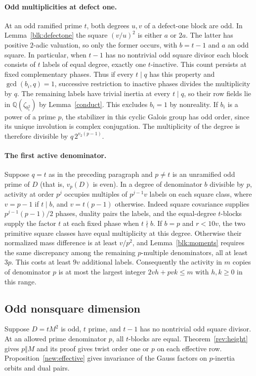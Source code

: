\documentclass[11pt]{amsart}
\numberwithin{equation}{section}
\theoremstyle{definition}
\theoremstyle{plain}
\newcommand{\QQ}{\mathbb Q}
\begin{document}
\paragraph{Odd multiplicities at defect one.}
At an odd ramified prime $t$, both degrees $u,v$ of a defect-one
block are odd. In Lemma~\ref{blk:defectone} the square $(v/u)^2$
is either $a$ or $2a$. The latter has positive $2$-adic valuation,
so only the former occurs, with $b=t-1$ and $a$ an odd square.
In particular, when $t-1$ has no nontrivial odd square divisor
each block consists of $t$ labels of equal degree, exactly one
$t$-inactive. This count persists at fixed complementary phases. Thus if every
$t\mid q$ has this property and $\gcd(b_i,q)=1$, successive restriction
to inactive phases divides the multiplicity by $q$. The remaining
labels have trivial inertia at every $t\mid q$, so their row fields
lie in $\QQ(\zeta_{b_i^2})$ by Lemma~\ref{conduct}. This excludes
$b_i=1$ by nonreality. If $b_i$ is a power of a prime $p$, the
stabilizer in this cyclic Galois group has odd order, since its unique
involution is complex conjugation. The multiplicity of the degree is
therefore divisible by $q\,2^{v_2(p-1)}$.

\paragraph{The first active denominator.}
Suppose $q=t$ as in the preceding paragraph and $p\ne t$ is an
unramified odd prime of $D$ (that is, $v_p(D)$ is even).
In a degree of denominator $b$ divisible by $p$, activity at order
$p^j$ occupies multiples of $p^{j-1}v$ labels on each square class,
where $v=p-1$ if $t\mid b$, and $v=t(p-1)$ otherwise. Indeed
square covariance supplies $p^{j-1}(p-1)/2$ phases, duality
pairs the labels, and the equal-degree $t$-blocks supply the factor
$t$ at each fixed phase when $t\nmid b$. If $b=p$ and $r<10v$,
the two primitive square classes have equal multiplicity at this degree.
Otherwise their normalized mass difference is at least $v/p^2$,
and Lemma~\ref{blk:moments} requires the same discrepancy among the
remaining $p$-multiple denominators, all at least $3p$.
This costs at least $9v$ additional labels. Consequently the activity
in $m$ copies of denominator $p$ is at most the largest integer
$2v h+pv k\le m$ with $h,k\ge0$ in this range.

\subsection{Odd nonsquare dimension}
Suppose $D=tM^2$ is odd, $t$ prime, and $t-1$ has no nontrivial
odd square divisor. At an allowed prime denominator $p$, all
$t$-blocks are equal. Theorem~\ref{rev:height} gives $p\Vert M$ and its proof gives twist order one or $p$ on each effective row. Proposition~\ref{new:effective} gives invariance of the Gauss factors on $p$-inertia orbits and dual pairs.
\end{document}
